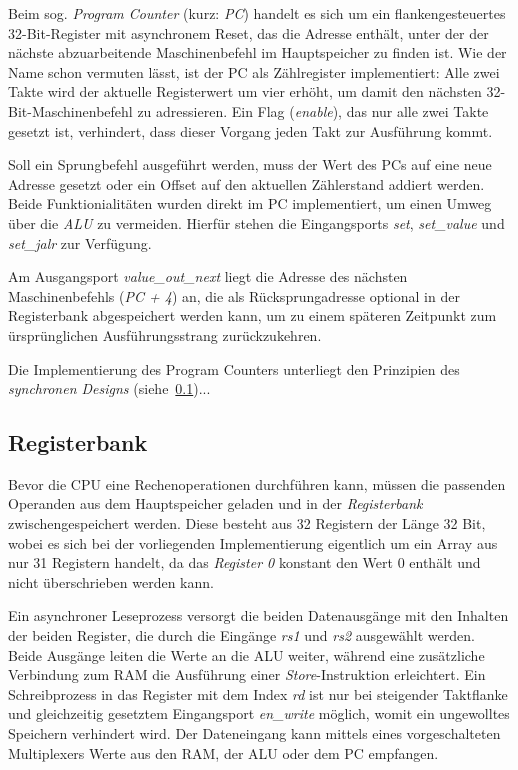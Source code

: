 Beim sog. \textit{Program Counter} (kurz: \textit{PC}) handelt es sich um ein flankengesteuertes 32-Bit-Register mit asynchronem Reset, das die Adresse enthält, unter der der nächste abzuarbeitende Maschinenbefehl im Hauptspeicher zu finden ist. 
Wie der Name schon vermuten lässt, ist der PC als Zählregister implementiert:
Alle zwei Takte wird der aktuelle Registerwert um vier erhöht, um damit den nächsten 32-Bit-Maschinenbefehl zu adressieren.
Ein Flag (\textit{enable}), das nur alle zwei Takte gesetzt ist, verhindert, dass dieser Vorgang jeden Takt zur Ausführung kommt.

Soll ein Sprungbefehl ausgeführt werden, muss der Wert des PCs auf eine neue Adresse gesetzt oder ein Offset auf den aktuellen Zählerstand addiert werden.
Beide Funktionialitäten wurden direkt im PC implementiert, um einen Umweg über die \textit{ALU} zu vermeiden.
Hierfür stehen die Eingangsports \textit{set}, \textit{set\_value} und \textit{set\_jalr} zur Verfügung.

Am Ausgangsport \textit{value\_out\_next} liegt die Adresse des nächsten Maschinenbefehls (\textit{PC + 4}) an, die als Rücksprungadresse optional in der Registerbank abgespeichert werden kann, um zu einem späteren Zeitpunkt zum ürsprünglichen Ausführungsstrang zurückzukehren.

Die Implementierung des Program Counters unterliegt den Prinzipien des \textit{synchronen Designs} (siehe~\ref{})...

\subsection{Registerbank}

Bevor die CPU eine Rechenoperationen durchführen kann, müssen die passenden Operanden aus dem Hauptspeicher geladen und in der \textit{Registerbank} zwischengespeichert werden.
Diese besteht aus 32 Registern der Länge 32 Bit, wobei es sich bei der vorliegenden Implementierung eigentlich um ein Array aus nur 31 Registern handelt, da das \textit{Register 0} konstant den Wert $0$ enthält und nicht überschrieben werden kann.

Ein asynchroner Leseprozess versorgt die beiden Datenausgänge mit den Inhalten der beiden Register, die durch die Eingänge \textit{rs1} und \textit{rs2} ausgewählt werden.
Beide Ausgänge leiten die Werte an die ALU weiter, während eine zusätzliche Verbindung zum RAM die Ausführung einer \textit{Store}-Instruktion erleichtert.
Ein Schreibprozess in das Register mit dem Index \textit{rd} ist nur bei steigender Taktflanke und gleichzeitig gesetztem Eingangsport \textit{en\_write} möglich, womit ein ungewolltes Speichern verhindert wird.
Der Dateneingang kann mittels eines vorgeschalteten Multiplexers Werte aus den RAM, der ALU oder dem PC empfangen.



